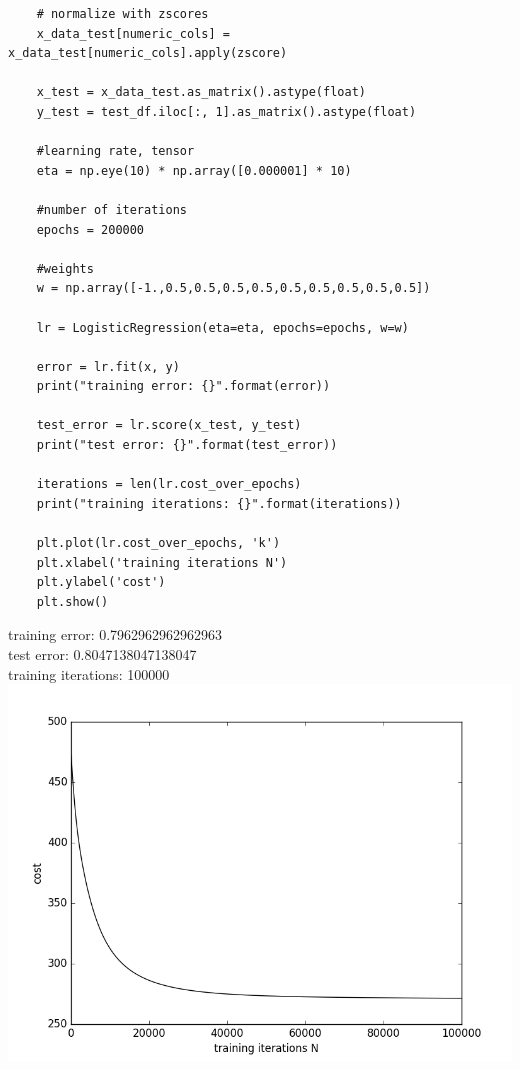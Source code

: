 \documentclass[12pt]{article}
\begin{document}
\begin{flushleft}
\begin{lstlisting}
	# normalize with zscores
	x_data_test[numeric_cols] = x_data_test[numeric_cols].apply(zscore)
	
	x_test = x_data_test.as_matrix().astype(float)
	y_test = test_df.iloc[:, 1].as_matrix().astype(float)
	
	#learning rate, tensor
	eta = np.eye(10) * np.array([0.000001] * 10)
	
	#number of iterations
	epochs = 200000
	
	#weights
	w = np.array([-1.,0.5,0.5,0.5,0.5,0.5,0.5,0.5,0.5,0.5])
	
	lr = LogisticRegression(eta=eta, epochs=epochs, w=w)
	
	error = lr.fit(x, y)
	print("training error: {}".format(error))
	
	test_error = lr.score(x_test, y_test)
	print("test error: {}".format(test_error))
	
	iterations = len(lr.cost_over_epochs)
	print("training iterations: {}".format(iterations))
	
	plt.plot(lr.cost_over_epochs, 'k')
	plt.xlabel('training iterations N')
	plt.ylabel('cost')
	plt.show()

		\end{lstlisting}
		
		training error: 0.7962962962962963\\
		test error: 0.8047138047138047\\
		training iterations: 100000\\
		
		\includegraphics[scale=0.5]{HW2_1B.png}
		\label{fig:graph 1B}
		

\end{flushleft}
\end{document}
